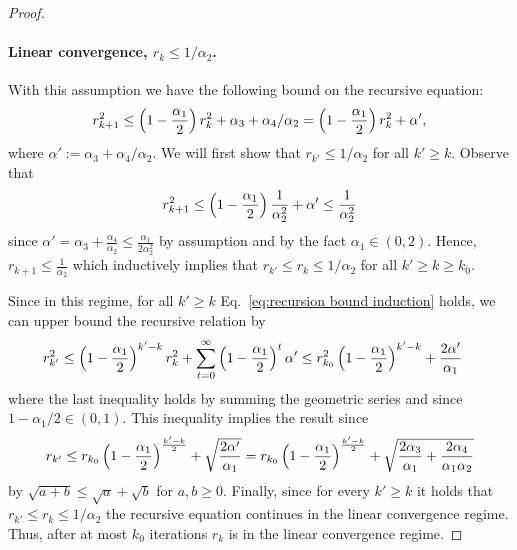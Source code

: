 \begin{proof}
\paragraph{Linear convergence, $r_k\leq 1/\alpha_2$.} With this assumption we have the following bound on the recursive equation:
 \begin{align}
     r_{k+1}^2 \leq \left(1-\frac{\alpha_1}{2}\right)r_{k}^2 +\alpha_3 +\alpha_4 /\alpha_2 = \left(1-\frac{\alpha_1}{2}\right)r_{k}^2 +\alpha', \label{eq:recursion bound induction}
 \end{align}
 where $\alpha':=\alpha_3 +\alpha_4 /\alpha_2.$
We will first show that $r_{k'}\leq 1/\alpha_2$ for all $k'\geq k.$ Observe that 
\begin{align*}
    r_{k+1}^2\leq \left(1-\frac{\alpha_1}{2}\right)\frac{1}{\alpha_2^2} +\alpha' \leq \frac{1}{\alpha_2^2}
\end{align*}
since $ \alpha' = \alpha_3 +\frac{\alpha_4}{\alpha_2} \leq \frac{\alpha_1}{2\alpha^2_2}$ by assumption and by the fact $\alpha_1 \in (0,2)$. Hence, $r_{k+1}\leq \frac{1}{\alpha_2}$ which inductively implies that  $r_{k'}\leq r_k \leq 1/\alpha_2$ for all $k'\geq k \geq k_0$.

Since in this regime, for all $k'\geq k$ Eq.~\eqref{eq:recursion bound induction} holds, we can upper bound the recursive relation by
\begin{align*}
    r_{k'}^2 &\leq \left(1-\frac{\alpha_1}{2}\right)^{k'-k} 
    r_k^2 + \sum_{t=0}^\infty \left(1-\frac{\alpha_1}{2}\right)^t \alpha' \leq r_{k_0}^2 \left(1-\frac{\alpha_1}{2}\right)^{k'-k} + \frac{2\alpha'}{\alpha_1}
\end{align*}
where the last inequality holds by summing the geometric series and since $1-\alpha_1/2\in (0,1).$ This inequality implies the result
since
\begin{align*}
    r_{k'}\leq r_{k_0} \left(1-\frac{\alpha_1}{2}\right)^{\frac{k'-k}{2}} + \sqrt{\frac{2\alpha'}{\alpha_1}} = r_{k_0} \left(1-\frac{\alpha_1}{2}\right)^{\frac{k'-k}{2}} + \sqrt{\frac{2\alpha_3}{\alpha_1}+\frac{2\alpha_4}{\alpha_1 \alpha_2}}
\end{align*}
by $\sqrt{a+b}\leq \sqrt{a}+\sqrt{b}$ for $a,b\geq 0$. Finally, since for every $k'\geq k$ it holds that $r_{k'}\leq r_{k} \leq 1/\alpha_2 $ the recursive equation continues in the linear convergence regime. Thus, after at most $k_0$ iterations $r_k$ is in the linear convergence regime.


\end{proof}



